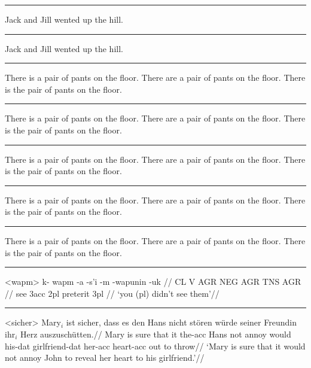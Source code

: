 \documentclass[12pt]{article}
\begin{document}
\filbreak\hrule\medskip

\begingroup
\ex *Jack and Jill wented up the hill.\xe
\endgroup
\bigskip

\filbreak\hrule\medskip

\begingroup
\ex \judge* Jack and Jill wented up the hill.\xe
\endgroup
\bigskip

\filbreak\hrule\medskip

\begingroup
\pex
\a There is a pair of pants on the floor.
\a {}There are a pair of pants on the floor.
\a \judge*There is the pair of pants on the floor.
\xe
\endgroup
\bigskip

\filbreak\hrule\medskip

\begingroup
\pex
\a There is a pair of pants on the floor.
\a {}There are a pair of pants on the floor.
\a \ljudge*There is the pair of pants on the floor.
\xe
\endgroup
\bigskip

\filbreak\hrule\medskip

\begingroup
\pex[*=?*]
\a There is a pair of pants on the floor.
\a {}There are a pair of pants on the floor.
\a \ljudge*There is the pair of pants on the floor.
\xe
\endgroup
\bigskip

\filbreak\hrule\medskip

\begingroup
\pex[*]
\a There is a pair of pants on the floor.
\a \ljudge* There are a pair of pants on the floor.
\a \ljudge* There is the pair of pants on the floor.
\xe
\endgroup
\bigskip

\filbreak\hrule\medskip

\begingroup
\pex[*=?*,textoffset=!-.3em]
\a There is a pair of pants on the floor.
\a {} There are a pair of pants on the floor.
\a \ljudge* There is the pair of pants on the floor.
\xe
\endgroup
\bigskip

\filbreak\hrule\medskip

\begingroup
\ex<wapm>
\begingl
\gla k- wapm -a -s'i -m -wapunin -uk //
\glb CL V AGR NEG AGR TNS AGR //
 see {\sc 3acc} {} {\sc 2pl} preterit {\sc 3pl} //
\glft `you (pl) didn't see them'//
\endgl
\xe
\endgroup
\bigskip

\filbreak\hrule\medskip

\begingroup
\ex<sicher>
\begingl
\gla Mary$_i$ ist sicher, dass es den Hans nicht st\"oren w\"urde
seiner Freundin ihr$_i$ Herz auszusch\"utten.//
\glb Mary is sure that it the-{\sc acc} Hans not annoy would
his-{\sc dat} girlfriend-{\sc dat} her-{\sc acc} heart-{\sc acc} {out to
throw}//
\glft  `Mary is sure that it would not annoy John to reveal her
heart to his girlfriend.'//
\endgl
\xe
\endgroup
\bigskip
\end{document}
